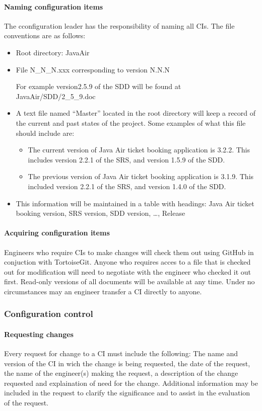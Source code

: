 \documentclass{scrartcl}
\begin{document}
\paragraph{Naming configuration items}
The cconfiguration leader has the responsibility of naming all CIs.  The file conventions are as follows:
\begin{itemize}[label={}, leftmargin=.5in]
\item Root directory: JavaAir

\item File N\_N\_N.xxx corresponding to version N.N.N
\setlength{\parindent}{5ex}
\par For example version2.5.9 of the SDD will be found at JavaAir/SDD/2\_5\_9.doc
\item A text file named ``Master'' located in the root directory will keep a record of the current and past states of the project.  Some examples of what this file should include are:
\begin{itemize}[label={}, leftmargin=.5in]
\item The current version of Java Air ticket booking application is 3.2.2.  This includes version 2.2.1 of the SRS, and version 1.5.9 of the SDD.
\item The previous version of Java Air ticket booking application is 3.1.9.  This included version 2.2.1 of the SRS, and version 1.4.0 of the SDD.
 \end{itemize}
 \item This information will be maintained in a table with headings: Java Air ticket booking version, SRS version, SDD version, \ldots, Release
\end{itemize}
\paragraph{Acquiring configuration items}
Engineers who require CIs to make changes will check them out using GitHub in conjuction with TortoiseGit.
Anyone who requires acces to a file that is checked out for modification will need to negotiate with the engineer who checked it out first.  Read-only versions of all documents will be available at any time.  Under no circumstances may an engineer transfer a CI directly to anyone.

\subsubsection{Configuration control}
\paragraph{Requesting changes}
Every request for change to a CI must include the following: The name and version of the CI in wich the change is being requested,  the date of the request, the name of the engineer(s) making the request, a description of the change requested and explaination of need for the change.  Additional information may be included in the request to clarify the significance and to assist in the evaluation of the request.
\end{document}
